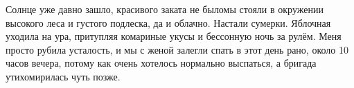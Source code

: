 Солнце уже давно зашло, красивого заката не было\mdash мы стояли в окружении высокого леса и густого подлеска, да и облачно. Настали сумерки. Яблочная уходила на ура, притупляя комариные укусы и бессонную ночь за рулём. Меня просто рубила усталость, и мы с женой залегли спать в этот день рано, около 10 часов вечера, потому как очень хотелось нормально выспаться, а бригада утихомирилась чуть позже.

\begin{center}
\end{center}
